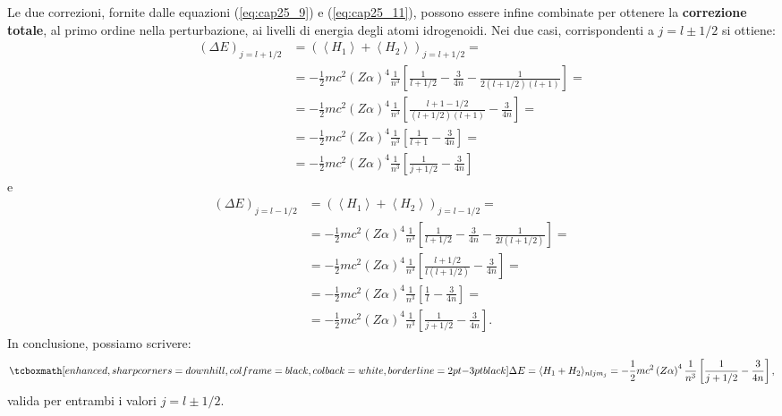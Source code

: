 Le due correzioni, fornite dalle equazioni (\ref{eq:cap25_9}) e (\ref{eq:cap25_11}), possono essere infine combinate per ottenere la \textbf{correzione totale}, al primo ordine nella perturbazione, ai livelli di energia degli atomi idrogenoidi. Nei due casi, corrispondenti a $j=l\pm1/2$ si ottiene:
	\begin{align} 
		\left( \Delta E \right)_{j=l+1/2} &= \left( \left< H_1\right> +\left<H_2 \right>  \right)_{j=l+1/2}= \nonumber \\
		& = -\frac{1}{2} mc^2 \left( Z\alpha \right)^4 \frac{1}{n^3} \left[ \frac{1}{l+1/2}-\frac{3}{4n}-\frac{1}{2(l+1/2)(l+1)}\right]=  \nonumber \\
		& =  -\frac{1}{2} mc^2 \left( Z\alpha \right)^4 \frac{1}{n^3} \left[ \frac{l+1-1/2}{(l+1/2)(l+1)}-\frac{3}{4n}\right]= \nonumber  \\
		& = -\frac{1}{2} mc^2 \left( Z\alpha \right)^4 \frac{1}{n^3} \left[ \frac{1}{l+1}-\frac{3}{4n} \right]= \nonumber \\
		& = -\frac{1}{2} mc^2 \left( Z\alpha \right)^4 \frac{1}{n^3} \left[ \frac{1}{j+1/2}-\frac{3}{4n} \right]
	\end{align}
e
	\begin{align} 
		 \left( \Delta E \right)_{j=l-1/2}&=\left( \left< H_1\right> +\left<H_2 \right>  \right)_{j=l-1/2}= \nonumber \\
		& = -\frac{1}{2} mc^2 \left( Z\alpha \right)^4 \frac{1}{n^3} \left[ \frac{1}{l+1/2}-\frac{3}{4n}-\frac{1}{2l(l+1/2)}\right]= \nonumber \\
		& = -\frac{1}{2} mc^2 \left( Z\alpha \right)^4 \frac{1}{n^3} \left[ \frac{l+1/2}{l(l+1/2)}-\frac{3}{4n}\right]= \nonumber \\
		& = -\frac{1}{2} mc^2 \left( Z\alpha \right)^4 \frac{1}{n^3} \left[ \frac{1}{l}-\frac{3}{4n} \right]= \nonumber  \\
		& = -\frac{1}{2} mc^2 \left( Z\alpha \right)^4 \frac{1}{n^3} \left[ \frac{1}{j+1/2}-\frac{3}{4n} \right] .
	\end{align}
In conclusione, possiamo scrivere:
	\begin{equation}
		\tcboxmath[enhanced, sharp corners=downhill, colframe=black, colback=white, borderline={2pt}{-3pt}{black}]{
			\Delta E = \langle H_1+H_2 \rangle_{nljm_j}= -\frac{1}{2}mc^2 \left( Z\alpha \right)^4 \frac{1}{n^3} \left[ \frac{1}{j+1/2}-\frac{3}{4n}\right] ,
			}
	\end{equation}
valida per entrambi i valori $j=l\pm1/2$. \\

